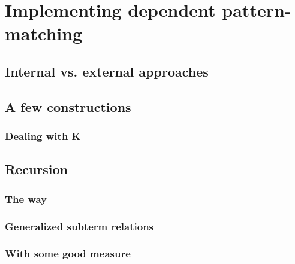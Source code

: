 \section{Implementing dependent pattern-matching}

\subsection{Internal vs. external approaches}

\subsection{A few constructions}

\subsubsection{Dealing with K}

\subsection{Recursion}

\subsubsection{The \Below way}

\subsubsection{Generalized subterm relations}

\subsubsection{With some good measure}

